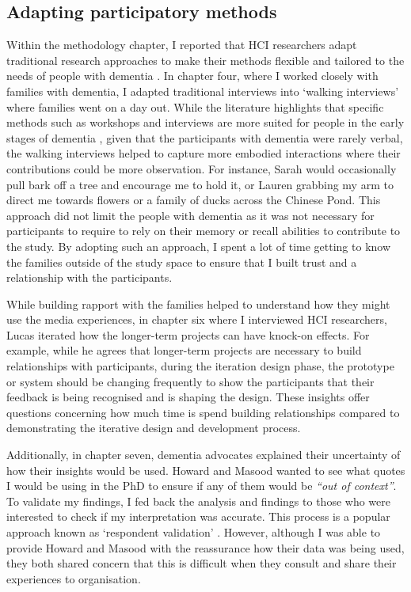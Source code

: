 \subsection{Adapting participatory methods}
\label{AdoptingMethods}
Within the methodology chapter, I reported that HCI researchers adapt traditional research approaches to make their methods flexible and tailored to the needs of people with dementia \citep{webb2020misfitting}. In chapter four, where I worked closely with families with dementia, I adapted traditional interviews into `walking interviews' \citep{kullberg2017walking} where families went on a day out. While the literature highlights that specific methods such as workshops and interviews are more suited for people in the early stages of dementia \citep{lindsay_empathy_2012}, given that the participants with dementia were rarely verbal, the walking interviews helped to capture more embodied interactions where their contributions could be more observation. For instance, Sarah would occasionally pull bark off a tree and encourage me to hold it, or Lauren grabbing my arm to direct me towards flowers or a family of ducks across the Chinese Pond. This approach did not limit the people with dementia as it was not necessary for participants to require to rely on their memory or recall abilities to contribute to the study. By adopting such an approach, I spent a lot of time getting to know the families outside of the study space to ensure that I built trust and a relationship with the participants. 

While building rapport with the families helped to understand how they might use the media experiences, in chapter six where I interviewed HCI researchers, Lucas iterated how the longer-term projects can have knock-on effects. For example, while he agrees that longer-term projects are necessary to build relationships with participants, during the iteration design phase, the prototype or system should be changing frequently to show the participants that their feedback is being recognised and is shaping the design. These insights offer questions concerning how much time is spend building relationships compared to demonstrating the iterative design and development process.

Additionally, in chapter seven, dementia advocates explained their uncertainty of how their insights would be used. Howard and Masood wanted to see what quotes I would be using in the PhD to ensure if any of them would be \textit{``out of context''}. To validate my findings, I fed back the analysis and findings to those who were interested to check if my interpretation was accurate. This process is a popular approach known as `respondent validation' \citep{richards2002ethics}. However, although I was able to provide Howard and Masood with the reassurance how their data was being used, they both shared concern that this is difficult when they consult and share their experiences to organisation.

